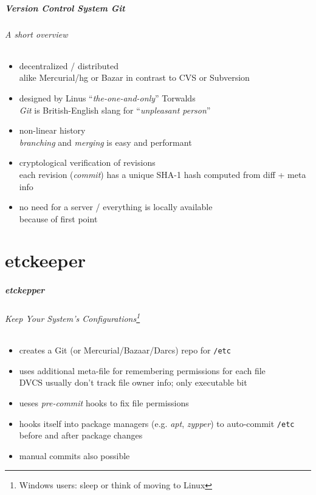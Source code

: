 \documentclass[english,hyperref={pdfpagelabels=false},aspectratio=169]{beamer}
\begin{document}
\begin{frame}[label=git]
  \frametitle{Version Control System \textit{Git}}
  \framesubtitle{A short overview}
  \begin{itemize}
    \item decentralized / distributed\\
      {\scriptsize alike Mercurial/hg or Bazar in contrast to CVS or Subversion}
    \item designed by Linus ``\textit{the-one-and-only}'' Torwalds\\
      {\scriptsize\textit{Git} is British-English slang for ``\textit{unpleasant person}''}
    \item non-linear history\\
      {\scriptsize \textit{branching} and \textit{merging} is easy and performant}
    \item cryptological verification of revisions\\
      {\scriptsize each revision (\textit{commit}) has a unique SHA-1 hash computed from diff + meta info}
    \item no need for a server / everything is locally available\\
      {\scriptsize because of first point}
  \end{itemize}
\end{frame}



\part{etckeeper}
\makepart

\begin{frame}[label=etckeeper]
  \frametitle{etckepper}
  \framesubtitle{Keep Your System's Configurations\footnote{\tiny Windows users: sleep or think of moving to Linux}}
  \begin{itemize}
    \item creates a Git {\scriptsize\color{fzjgray50}(or Mercurial/Bazaar/Darcs)} repo for \texttt{/etc}
    \item uses additional meta-file for remembering permissions for each file\\
      {\scriptsize DVCS usually don't track file owner info; only executable bit}
    \item ueses \textit{pre-commit} hooks to fix file permissions
    \item hooks itself into package managers {\scriptsize\color{fzjgray50}(e.g. \textit{apt}, \textit{zypper})} to auto-commit \texttt{/etc} before and after package changes
    \item manual commits also possible
  \end{itemize}
\end{frame}
\end{document}
